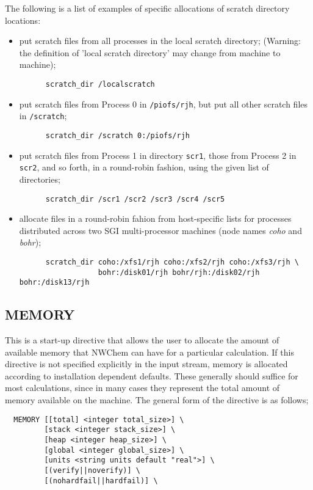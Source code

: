 The following is a list of examples of specific allocations of scratch
directory locations:
\begin{itemize}
\item put scratch files from all processes in the local scratch directory; 
(Warning: the definition of 'local scratch directory' may change from 
machine to machine);
\begin{verbatim}
      scratch_dir /localscratch
\end{verbatim}
\item put scratch files from Process 0 in \verb+/piofs/rjh+, but put all 
other scratch files in \verb+/scratch+;
\begin{verbatim}
      scratch_dir /scratch 0:/piofs/rjh
\end{verbatim}
\item put scratch files from Process 1 in directory \verb+scr1+, those from
Process 2 in \verb+scr2+, and so forth, in a round-robin fashion, using the
given list of directories;
\begin{verbatim}
      scratch_dir /scr1 /scr2 /scr3 /scr4 /scr5
\end{verbatim}
\item allocate files in a round-robin fahion from
  host-specific lists for processes distributed across two
 SGI multi-processor machines (node names {\it coho} and {\it bohr});
\begin{verbatim}
      scratch_dir coho:/xfs1/rjh coho:/xfs2/rjh coho:/xfs3/rjh \
                  bohr:/disk01/rjh bohr/rjh:/disk02/rjh bohr:/disk13/rjh
\end{verbatim}
\end{itemize}

\subsection{MEMORY}


This is a start-up directive that allows the user to allocate the amount
of available memory that NWChem can have for a particular calculation.
If this directive is not specified explicitly in the input stream, memory
is allocated according to installation
dependent defaults.  These generally should suffice for most calculations,
since in many cases they represent the total amount of memory available on
the machine.
The general form of the 
directive is as follows;


\begin{verbatim}
  MEMORY [[total] <integer total_size>] \
         [stack <integer stack_size>] \
         [heap <integer heap_size>] \
         [global <integer global_size>] \
         [units <string units default "real">] \
         [(verify||noverify)] \
         [(nohardfail||hardfail)] \
\end{verbatim}

